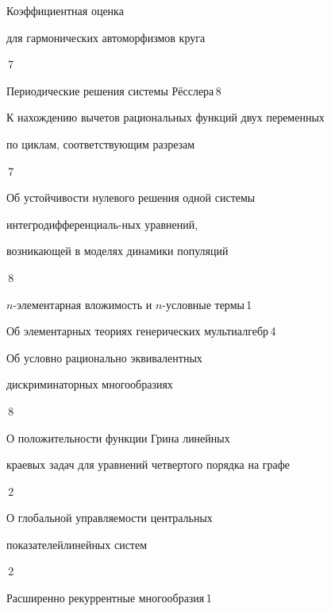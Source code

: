 

{Коэффициентная оценка  


для гармонических автоморфизмов круга}{\No\,7}




{Периодические решения системы Р\"е{}сслера}{\No\,8}




{К нахождению вычетов рациональных функций двух переменных\newline


по циклам, соответствующим разрезам}{\No\,7}




{Об устойчивости нулевого решения одной системы 


интегродифференциаль-\newline ных уравнений,


возникающей в моделях динамики популяций}{\No\,8}




{$n$-элементарная вложимость и $n$-условные термы}{\No\,1}




{Об элементарных теориях генерических мультиалгебр}{\No\,4}




{Об условно рационально эквивалентных


дискриминаторных многообразиях}{\No\,8}




{О положительности функции Грина линейных\newline


краевых задач для уравнений четвертого порядка на графе}{\No\,2}






{О глобальной управляемости центральных


показателей\newline линейных систем}{\No\,2}




{Расширенно рекуррентные многообразия}{\No\,1}




